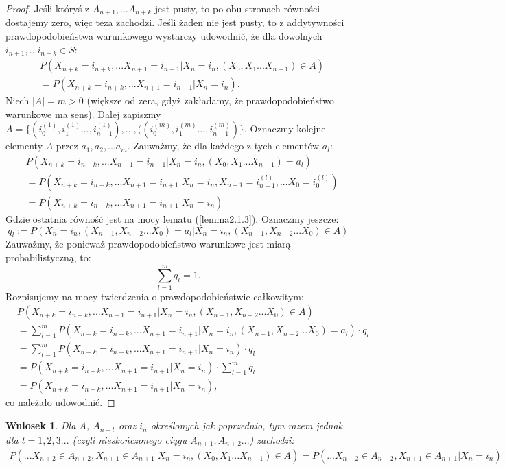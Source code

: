 \documentclass[a4paper]{article}
\theoremstyle{defn}
\theoremstyle{theorem}
\theoremstyle{lemma}
\theoremstyle{cor}
\newtheorem{cor}[defn]{Wniosek}
\theoremstyle{fact}
\begin{document}
\begin{proof}
Jeśli któryś z $A_{n+1}, ... A_{n+k}$ jest pusty, to po obu stronach równości dostajemy zero, więc teza zachodzi. Jeśli żaden nie jest pusty, to z addytywności prawdopodobieństwa warunkowego wystarczy udowodnić, że dla dowolnych $i_{n+1}, ... i_{n+k} \in S$:
\begin{align*}
&P(X_{n+k} = i_{n+k}, ...X_{n+1} = i_{n+1} |X_n = i_n, (X_{0}, X_{1} ... X_{n-1}) \in A)\\
&= P(X_{n+k} = i_{n+k}, ...X_{n+1} = i_{n+1} |X_n = i_n).
\end{align*}
Niech $|A| = m > 0$ (większe od zera, gdyż zakładamy, że prawdopodobieństwo warunkowe ma sens). Dalej zapiszmy $A = \{(i_0^{(1)}, i_1^{(1)}..., i_{n-1}^{(1)}), ..., ((i_0^{(m)}, i_1^{(m)}..., i_{n-1}^{(m)})\}$. Oznaczmy kolejne elementy $A$ przez $a_1, a_2, ... a_m$.
Zauważmy, że dla każdego z tych elementów $a_l$:
\begin{align*}
    &P(X_{n+k} = i_{n+k}, ...X_{n+1} = i_{n+1} |X_n = i_n, (X_{0}, X_{1} ... X_{n-1}) = a_l) \\
    &= P(X_{n+k} = i_{n+k}, ...X_{n+1} = i_{n+1} |X_n = i_n, X_{n-1} = i_{n-1}^{(l)}, ... X_0 = i_{0}^{(l)})\\
    &= P(X_{n+k} = i_{n+k}, ...X_{n+1} = i_{n+1} |X_n = i_n)
\end{align*}
Gdzie ostatnia równość jest na mocy lematu (\ref{lemma2.1.3}). Oznaczmy jeszcze:
$$ q_l :=P(X_n = i_n, (X_{n-1}, X_{n-2} ... X_0) = a_l|X_n = i_n, (X_{n-1}, X_{n-2} ... X_0) \in A)$$
Zauważmy, że ponieważ prawdopodobieństwo warunkowe jest miarą probabilistyczną, to:
$$\sum\limits_{l = 1}^m q_l = 1.$$
Rozpisujemy na mocy twierdzenia o prawdopodobieństwie całkowitym:
\begin{align*}
    &P(X_{n+k} = i_{n+k}, ...X_{n+1} = i_{n+1} |X_n = i_n, (X_{n-1}, X_{n-2} ... X_0) \in A) \\
    &= \sum\limits_{l = 1}^m  P(X_{n+k} = i_{n+k}, ...X_{n+1} = i_{n+1} |X_n = i_n, (X_{n-1}, X_{n-2} ... X_0) = a_l)\cdot q_l\\
    &= \sum\limits_{l = 1}^m  P(X_{n+k} = i_{n+k}, ...X_{n+1} = i_{n+1} |X_n = i_n)\cdot q_l\\
    &= P(X_{n+k} = i_{n+k}, ...X_{n+1} = i_{n+1} |X_n = i_n) \cdot \sum\limits_{l = 1}^m q_l \\
    &= P(X_{n+k} = i_{n+k}, ...X_{n+1} = i_{n+1} |X_n = i_n),
\end{align*}
co należało udowodnić.
\end{proof}
\begin{cor}\label{cor2.1.5}
Dla $A$, $A_{n+t}$ oraz $i_n$ określonych jak poprzednio, tym razem jednak dla $t = 1,2,3...$ (czyli nieskończonego ciągu $A_{n+1}, A_{n+2}...$) zachodzi:
\begin{align*}
P(...X_{n+2} \in A_{n+2}, X_{n+1} \in A_{n+1}|X_n = i_n, (X_{0}, X_{1} ... X_{n-1}) \in A) = P(...X_{n+2} \in A_{n+2}, X_{n+1} \in A_{n+1}|X_n = i_n)
\end{align*}
\end{cor}\label{cor2.1.5}
\end{document}
